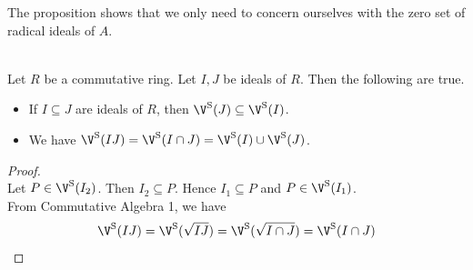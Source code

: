 \documentclass[a4paper]{article}
\begin{document}
The proposition shows that we only need to concern ourselves with the zero set of radical ideals of $A$. 

\begin{lmm}{}{}\\
Let $R$ be a commutative ring. Let $I,J$ be ideals of $R$. Then the following are true. 
\begin{itemize}
\item If $I\subseteq J$ are ideals of $R$, then $\V^\text{S}(J)\subseteq\V^\text{S}(I)$. 
\item We have $\V^\text{S}(IJ)=\V^\text{S}(I\cap J)=\V^\text{S}(I)\cup\V^\text{S}(J)$. 
\end{itemize}
\begin{proof}\\
Let $P\in\V^\text{S}(I_2)$. Then $I_2\subseteq P$. Hence $I_1\subseteq P$ and $P\in\V^\text{S}(I_1)$. \\

From Commutative Algebra 1, we have $$\V^\text{S}(IJ)=\V^\text{S}(\sqrt{IJ})=\V^\text{S}(\sqrt{I\cap J})=\V^\text{S}(I\cap J)$$
\end{proof}
\end{lmm}
\end{document}

